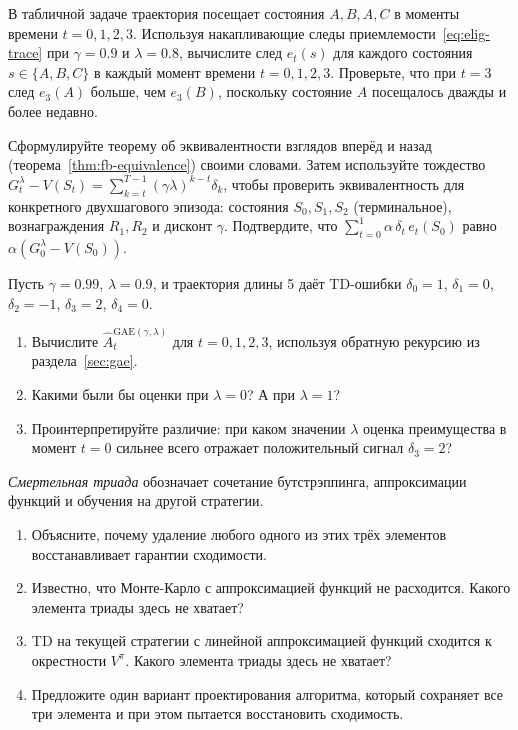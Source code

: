 \begin{exercise}
\label{ex:elig-trace-compute}
В табличной задаче траектория посещает состояния $A, B, A, C$ в моменты времени $t=0,1,2,3$.  Используя накапливающие следы приемлемости~\eqref{eq:elig-trace} при $\gamma=0.9$ и $\lambda=0.8$, вычислите след $e_t(s)$ для каждого состояния $s\in\{A,B,C\}$ в каждый момент времени $t=0,1,2,3$.  Проверьте, что при $t=3$ след $e_3(A)$ больше, чем $e_3(B)$, поскольку состояние $A$ посещалось дважды и более недавно.
\end{exercise}

\begin{exercise}
\label{ex:td-lambda-equiv}
Сформулируйте теорему об эквивалентности взглядов вперёд и назад (теорема~\ref{thm:fb-equivalence}) своими словами.  Затем используйте тождество $G_t^\lambda - V(S_t) = \sum_{k=t}^{T-1}(\gamma\lambda)^{k-t}\delta_k$, чтобы проверить эквивалентность для конкретного двухшагового эпизода: состояния $S_0, S_1, S_2$ (терминальное), вознаграждения $R_1, R_2$ и дисконт $\gamma$.  Подтвердите, что $\sum_{t=0}^{1}\alpha\,\delta_t\,e_t(S_0)$ равно $\alpha(G_0^\lambda - V(S_0))$.
\end{exercise}

\begin{exercise}
\label{ex:gae-compute}
Пусть $\gamma=0.99$, $\lambda=0.9$, и траектория длины 5 даёт TD-ошибки $\delta_0=1$, $\delta_1=0$, $\delta_2=-1$, $\delta_3=2$, $\delta_4=0$.
\begin{enumerate}[label=(\alph*)]
  \item Вычислите $\hat A_t^{\mathrm{GAE}(\gamma,\lambda)}$ для $t=0,1,2,3$, используя обратную рекурсию из раздела~\ref{sec:gae}.
  \item Какими были бы оценки при $\lambda=0$?  А при $\lambda=1$?
  \item Проинтерпретируйте различие: при каком значении $\lambda$ оценка преимущества в момент $t=0$ сильнее всего отражает положительный сигнал $\delta_3=2$?
\end{enumerate}
\end{exercise}

\begin{exercise}
\label{ex:deadly-triad}
\emph{Смертельная триада} обозначает сочетание бутстрэппинга, аппроксимации функций и обучения на другой стратегии.
\begin{enumerate}[label=(\alph*)]
  \item Объясните, почему удаление любого одного из этих трёх элементов восстанавливает гарантии сходимости.
  \item Известно, что Монте-Карло с аппроксимацией функций не расходится.  Какого элемента триады здесь не хватает?
  \item TD на текущей стратегии с линейной аппроксимацией функций сходится к окрестности $V^\pi$.  Какого элемента триады здесь не хватает?
  \item Предложите один вариант проектирования алгоритма, который сохраняет все три элемента и при этом пытается восстановить сходимость.
\end{enumerate}
\end{exercise}

